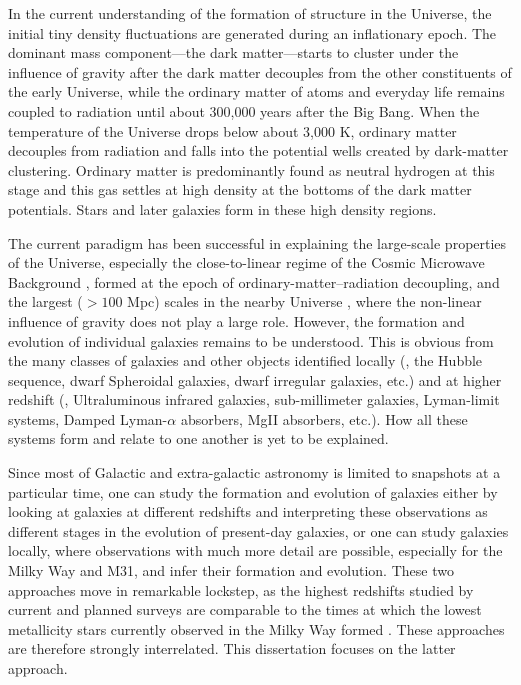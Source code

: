 In the current understanding of the formation of structure in the
Universe, the initial tiny density fluctuations are generated during an
inflationary epoch. The dominant mass component---the dark
matter---starts to cluster under the influence of gravity after the
dark matter decouples from the other constituents of the early
Universe, while the ordinary matter of atoms and everyday life remains
coupled to radiation until about 300,000 years after the Big
Bang. When the temperature of the Universe drops below about 3,000 K,
ordinary matter decouples from radiation and falls into the potential
wells created by dark-matter clustering. Ordinary matter is
predominantly found as neutral hydrogen at this stage and this gas
settles at high density at the bottoms of the dark matter
potentials. Stars and later galaxies form in these high density regions.

The current paradigm has been successful in explaining the large-scale
properties of the Universe, especially the close-to-linear regime of
the Cosmic Microwave Background \citep{Komatsu11a}, formed at the
epoch of ordinary-matter--radiation decoupling, and the largest ($>
100$ Mpc) scales in the nearby
Universe \citep{Eisenstein05a,Tegmark06a}, where the non-linear
influence of gravity does not play a large role. However, the
formation and evolution of individual galaxies remains to be
understood. This is obvious from the many classes of galaxies and
other objects identified locally (\eg, the Hubble sequence, dwarf
Spheroidal galaxies, dwarf irregular galaxies, etc.)  and at higher
redshift (\eg, Ultraluminous infrared galaxies, sub-millimeter
galaxies, Lyman-limit systems, Damped Lyman-$\alpha$ absorbers, MgII
absorbers, etc.). How all these systems form and relate to one another
is yet to be explained.

Since most of Galactic and extra-galactic astronomy is limited to
snapshots at a particular time, one can study the formation and
evolution of galaxies either by looking at galaxies at different
redshifts and interpreting these observations as different stages in
the evolution of present-day galaxies, or one can study galaxies
locally, where observations with much more detail are possible,
especially for the Milky Way and M31, and infer their formation and
evolution. These two approaches move in remarkable lockstep, as the
highest redshifts studied by current and planned
surveys are comparable to the times at which the lowest metallicity
stars currently observed in the Milky Way
formed \citep{Freeman02a}. These approaches are therefore strongly
interrelated. This dissertation focuses on the latter approach.

